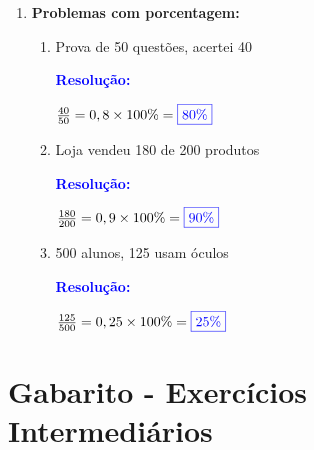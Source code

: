 \documentclass[11pt]{article}
\newcommand{\respostaNum}[1]{\textcolor{blue}{\boxed{#1}}}
\newcommand{\resolucao}{\textbf{\textcolor{blue}{Resolução:}}}
\begin{document}
\begin{multicols}{2}
\begin{enumerate}[leftmargin=*]
\begin{enumerate}[label=\alph*)]
\item 30 acertos em 40 questões

\resolucao

\textbf{\textcolor{red}{Etapa 1:}} Dividir parte pelo todo: $\frac{30}{40} = 0,75$

\textbf{\textcolor{red}{Etapa 2:}} Multiplicar por 100\%: $0,75 \times 100\% = \respostaNum{75\%}$

\item 12 meninas em 30 alunos

\resolucao

$\frac{12}{30} = 0,4 \times 100\% = \respostaNum{40\%}$

\item 45 gols em 60 jogos

\resolucao

$\frac{45}{60} = 0,75 \times 100\% = \respostaNum{75\%}$

\item R\$ 18,00 de desconto em R\$ 120,00

\resolucao

$\frac{18}{120} = 0,15 \times 100\% = \respostaNum{15\%}$
\end{enumerate}

\item \textbf{Problemas com porcentagem:}

\begin{enumerate}[label=\alph*)]
\item Prova de 50 questões, acertei 40

\resolucao

$\frac{40}{50} = 0,8 \times 100\% = \respostaNum{80\%}$

\item Loja vendeu 180 de 200 produtos

\resolucao

$\frac{180}{200} = 0,9 \times 100\% = \respostaNum{90\%}$

\item 500 alunos, 125 usam óculos

\resolucao

$\frac{125}{500} = 0,25 \times 100\% = \respostaNum{25\%}$
\end{enumerate}
\end{enumerate}

\section*{Gabarito - Exercícios Intermediários}


\end{multicols}
\end{document}
